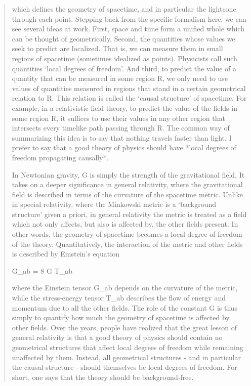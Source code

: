 \begin{quote}
which defines the geometry of spacetime, and in particular the lightcone
through each point.  Stepping back from the specific formalism here, we
can see several ideas at work.  First, space and time form a unified
whole which can be thought of geometrically.  Second, the quantities
whose values we seek to predict are localized.  That is, we can measure
them in small regions of spacetime (sometimes idealized as points).  
Physicists call such quantities `local degrees of freedom'.  And third,
to predict the value of a quantity that can be measured in some region
R, we only need to use values of quantities measured in regions that
stand in a certain geometrical relation to R.  This relation is called
the `causal structure' of spacetime.  For example, in a relativistic
field theory, to predict the value of the fields in some region R, it
suffices to use their values in any other region that intersects every
timelike path passing through R.  The common way of summarizing this
idea is to say that nothing travels faster than light.  I prefer to say
that a good theory of physics should have *local degrees of freedom
propagating causally*. 

In Newtonian gravity, G is simply the strength of the gravitational
field.  It takes on a deeper significance in general relativity, where
the gravitational field is described in terms of the curvature of the
spacetime metric.  Unlike in special relativity, where the Minkowski 
metric is a `background structure' given a priori, in general relativity
the metric is treated as a field which not only affects, but also is
affected by, the other fields present.  In other words, the geometry of
spacetime becomes a local degree of freedom of the theory.
Quantitatively, the interaction of the metric and other fields is
described by Einstein's equation

                 G_{ab} = 8 \pi  G T_{ab}

where the Einstein tensor G_{ab} depends on the curvature of the
metric, while the stress-energy tensor T_{ab} describes the flow
of energy and momentum due to all the other fields.  The role of the
constant G is thus simply to quantify how much the geometry of
spacetime is affected by other fields.   Over the years, people have
realized that the great lesson of general relativity is that a good
theory of physics should contain no geometrical structures that affect
local degrees of freedom while remaining unaffected by them.  Instead,
all geometrical structures - and in particular the causal structure -
should themselves be local degrees of freedom.  For short, one says
that the theory should be background-free.
 

\end{quote}
